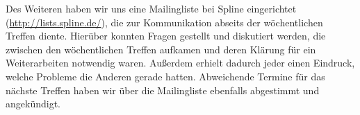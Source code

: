 Des Weiteren haben wir uns eine Mailingliste bei Spline eingerichtet (\url{http://lists.spline.de/}), die zur Kommunikation abseits der wöchentlichen Treffen diente. Hierüber konnten Fragen gestellt und diskutiert werden, die zwischen den wöchentlichen Treffen aufkamen und deren Klärung für ein Weiterarbeiten notwendig waren. Außerdem erhielt dadurch jeder einen Eindruck, welche Probleme die Anderen gerade hatten. Abweichende Termine für das nächste Treffen haben wir über die Mailingliste ebenfalls abgestimmt und angekündigt.

